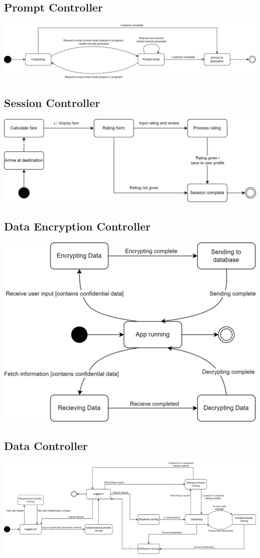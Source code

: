 \documentclass[]{article}
\begin{document}
\subsection*{Prompt Controller}
\includegraphics[scale=0.65]{StateCharts/Prompts.png}

\subsection*{Session Controller}
\includegraphics{StateCharts/Session.png}

\subsection*{Data Encryption Controller}
\includegraphics{StateCharts/DataEncryption.png}

\subsection*{Data Controller}
\includegraphics[scale=0.55]{StateCharts/Data.png}
\end{document}
